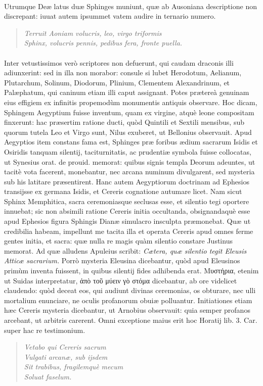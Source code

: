 \documentclass[a4paper, 11pt, oneside, polutonikogreek, latin]{article}
\begin{document}
\paragraph{}
Utrumque Deæ latus duæ Sphinges muniunt, quæ ab Ausoniana descriptione non discrepant: iuuat autem ipsummet vatem audire in ternario numero.
\begin{quote}
\emph{Terruit Aoniam volucris, leo, virgo triformis}\\
\emph{Sphinx, volucris pennis, pedibus fera, fronte puella.}\\
\end{quote}
\paragraph{}
Inter vetustissimos verò scriptores non defuerunt, qui caudam draconis illi adiunxerint: sed in illa non morabor: consule si lubet Herodotum, Aelianum, Plutarchum, Solinum, Diodorum, Plinium, Clementem Alexandrinum, et Palæphatum, qui caninum etiam illi caput assignant. Potes prætereà genuinam eius effigiem ex infinitis propemodùm monumentis antiquis observare. Hoc dicam, Sphingem Aegyptium fuisse inventum, quam ex virgine, atquè leone compositam finxerunt: hac præsertim ratione ducti, quòd Quintili et Sextili mensibus, sub quorum tutela Leo et Virgo sunt, Nilus exuberet, ut Bellonius observauit. Apud Aegyptios item constans fama est, Sphinges præ foribus ædium sacrarum Isidis et Osiridis tanquam silentij, taciturnitatis, ac prudentiæ symbola fuisse collocatas, ut Synesius orat. de prouid. memorat: quibus signis templa Deorum adeuntes, ut tacitè vota facerent, monebantur, nec arcana numinum divulgarent, sed mysteria sub his latitare præsentirent. Hanc autem Aegyptiorum doctrinam ad Ephesios transijsse ex germana Isidis, et Cereris cognatione autumare licet. Nam sicut Sphinx Memphitica, sacra ceremoniasque seclusas esse, et silentio tegi oportere innuebat; sic non absimili ratione Cereris initia occultanda, obsignandaquè esse apud Ephesios figura Sphingis Dianæ simulacro insculpta præmonebat. Quæ ut credibilia habeam, impellunt me tacita illa et operata Cereris apud omnes ferme gentes initia, et sacra: quæ nulla re magis quàm silentio constare Justinus memorat. Ad quæ alludens Apuleius scribit: \emph{Cætera, quæ silentio tegit Eleusis Atticæ sacrarium.} Porrò mysteria Eleusina dicebantur, quòd apud Eleusinos primùm inventa fuissent, in quibus silentij fides adhibenda erat. Μυστήρια, etenim ut Suidas interpretatur, ἀπὸ τοῦ μύειν 	γὸ στόμα dicebantur, ab ore videlicet claudendo: quòd deceat eos, qui audiunt divinas ceremonias, os obturare, nec ulli mortalium enunciare, ne oculis profanorum obuiæ polluantur. Initiationes etiam hæc Cereris mysteria dicebantur, ut Arnobius observauit: quia semper profanos arcebant, ut arbitris carerent. Omni exceptione maius erit hoc Horatij lib. 3. Car. super hac re testimonium.
\begin{quote}
\emph{Vetabo qui Cereris sacrum}\\
\emph{Vulgati arcanæ, sub ijsdem}\\
\emph{Sit trabibus, fragilemquè mecum}\\
\emph{Soluat faselum.}\\
\end{quote}
\end{document}

